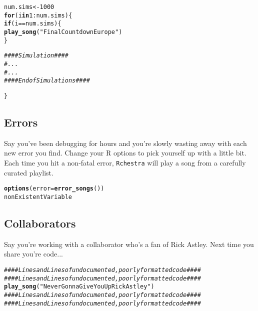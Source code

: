 \documentclass{article}\usepackage[]{graphicx}\usepackage[]{color}
\makeatletter
\newcommand{\hlnum}[1]{\textcolor[rgb]{0.686,0.059,0.569}{#1}}%
\newcommand{\hlstr}[1]{\textcolor[rgb]{0.192,0.494,0.8}{#1}}%
\newcommand{\hlcom}[1]{\textcolor[rgb]{0.678,0.584,0.686}{\textit{#1}}}%
\newcommand{\hlopt}[1]{\textcolor[rgb]{0,0,0}{#1}}%
\newcommand{\hlstd}[1]{\textcolor[rgb]{0.345,0.345,0.345}{#1}}%
\newcommand{\hlkwa}[1]{\textcolor[rgb]{0.161,0.373,0.58}{\textbf{#1}}}%
\newcommand{\hlkwb}[1]{\textcolor[rgb]{0.69,0.353,0.396}{#1}}%
\newcommand{\hlkwc}[1]{\textcolor[rgb]{0.333,0.667,0.333}{#1}}%
\newcommand{\hlkwd}[1]{\textcolor[rgb]{0.737,0.353,0.396}{\textbf{#1}}}%
\newenvironment{kframe}{%
 \def\at@end@of@kframe{}%
 \ifinner\ifhmode%
  \def\at@end@of@kframe{\end{minipage}}%
  \begin{minipage}{\columnwidth}%
 \fi\fi%
 \def\FrameCommand##1{\hskip\@totalleftmargin \hskip-\fboxsep
 \colorbox{shadecolor}{##1}\hskip-\fboxsep
     \hskip-\linewidth \hskip-\@totalleftmargin \hskip\columnwidth}%
 \MakeFramed {\advance\hsize-\width
   \@totalleftmargin\z@ \linewidth\hsize
   \@setminipage}}%
 {\par\unskip\endMakeFramed%
 \at@end@of@kframe}
\newenvironment{knitrout}{}{} %
\makeatother
\begin{document}
\begin{knitrout}
\color{fgcolor}\begin{kframe}
\begin{alltt}
\hlstd{num.sims} \hlkwb{<-} \hlnum{1000}
\hlkwa{for}\hlstd{(i} \hlkwa{in} \hlnum{1}\hlopt{:}\hlstd{num.sims)\{}
  \hlkwa{if}\hlstd{(i} \hlopt{==} \hlstd{num.sims)\{}
    \hlkwd{play_song}\hlstd{(}\hlstr{"Final Countdown Europe"}\hlstd{)}
  \hlstd{\}}

  \hlcom{#### Simulation ####}
  \hlcom{# ...}
  \hlcom{# ...}
  \hlcom{#### End of Simulations ####}

\hlstd{\}}
\end{alltt}
\end{kframe}
\end{knitrout}


\subsection{Errors}
Say you've been debugging for hours and you're slowly wasting away with each new error you find. Change your R options to pick yourself up with a little bit. Each time you hit a non-fatal error, \texttt{Rchestra} will play a song from a carefully curated playlist.

\begin{knitrout}
\color{fgcolor}\begin{kframe}
\begin{alltt}
\hlkwd{options}\hlstd{(}\hlkwc{error} \hlstd{=} \hlkwd{error_songs}\hlstd{())}
\hlstd{nonExistentVariable}
\end{alltt}
\end{kframe}
\end{knitrout}

\subsection{Collaborators}
Say you're working with a collaborator who's a fan of Rick Astley. Next time you share you're code...
\begin{knitrout}
\color{fgcolor}\begin{kframe}
\begin{alltt}
\hlcom{#### Lines and Lines of undocumented, poorly formatted code ####}
\hlcom{#### Lines and Lines of undocumented, poorly formatted code ####}
\hlkwd{play_song}\hlstd{(}\hlstr{"Never Gonna Give You Up Rick Astley"}\hlstd{)}
\hlcom{#### Lines and Lines of undocumented, poorly formatted code ####}
\hlcom{#### Lines and Lines of undocumented, poorly formatted code ####}
\end{alltt}
\end{kframe}
\end{knitrout}
\end{document}
